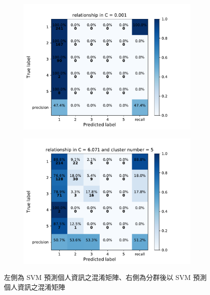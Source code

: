 {\begin{figure}[h]
    \centering
    \begin{subfigure}
      \centering
      \includegraphics[scale=0.45]{fig/super_svm_relationship.pdf}
    \end{subfigure}%
    \begin{subfigure}
      \centering
      \includegraphics[scale=0.45]{fig/kms_svm_relationship.pdf}
    \end{subfigure}
    \caption{左側為 SVM 預測個人資訊之混淆矩陣、右側為分群後以 SVM 預測個人資訊之混淆矩陣}
    \label{fig:svm_con}
\end{figure}

}
\clearpage
